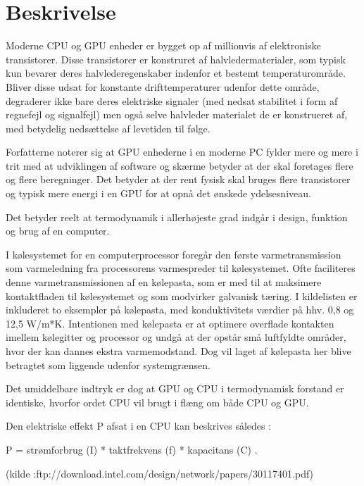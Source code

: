 \section{Beskrivelse}

Moderne CPU og GPU enheder er bygget op af millionvis af elektroniske transistorer.  Disse transistorer er konstruret af halvledermaterialer, som typisk kun bevarer deres halvlederegenskaber indenfor et bestemt temperaturområde. Bliver disse udsat for konstante drifttemperaturer udenfor dette område, degraderer ikke bare deres elektriske signaler (med nedsat stabilitet i form af regnefejl og signalfejl) men også selve halvleder materialet de er konstrueret af, med betydelig nedsættelse af levetiden til følge.

Forfatterne noterer sig at GPU enhederne i en moderne PC fylder mere og mere i trit med at udviklingen af software og skærme betyder at der skal foretages flere og flere beregninger.  Det betyder at der rent fysisk skal bruges flere transistorer og typisk mere energi i en GPU for at opnå det ønskede ydelsesniveau.

Det betyder reelt at termodynamik i allerhøjeste grad indgår i design, funktion og brug af en computer.

I kølesystemet for en computerprocessor foregår den første varmetransmission som varmeledning fra processorens varmespreder til kølesystemet.
Ofte faciliteres denne varmetransmissionen af en kølepasta, som er med til at maksimere kontaktfladen til kølesystemet og som modvirker galvanisk tæring.
I kildelisten er inkluderet to eksempler på kølepasta, med konduktivitets værdier på hhv. 0,8 og 12,5 W/m*K.
Intentionen med kølepasta er at optimere overflade kontakten imellem kølegitter og processor og undgå at der opstår små luftfyldte områder, hvor der kan dannes ekstra varmemodstand. Dog vil laget af kølepasta her blive betragtet som liggende udenfor systemgrænsen.

Det umiddelbare indtryk er dog at GPU og CPU i termodynamisk forstand er identiske, hvorfor ordet CPU vil brugt i flæng om både CPU og GPU.

Den elektriske effekt P afsat i en CPU kan beskrives således :

 P = strømforbrug (I) * taktfrekvens (f) * kapacitans (C) .

 (kilde :ftp://download.intel.com/design/network/papers/30117401.pdf)

